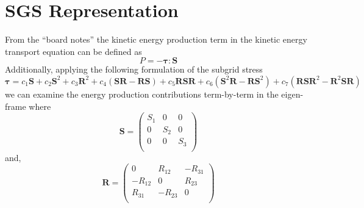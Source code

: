 \newcommand{\sgsvec}{\mathbf{\tau}} 
\newcommand{\svec}{\mathbf{S}}
\newcommand{\rvec}{\mathbf{R}}
\newpage
\section{SGS Representation}
From the ``board notes'' the kinetic energy production term in the kinetic
energy transport equation can be defined as
\begin{equation}
    P =  - \sgsvec:\svec
\end{equation}
Additionally, applying the following  formulation of the subgrid stress 
\begin{equation}
    \sgsvec = c_{1} \svec + c_{2} \svec^2 + c_{3} \rvec^2
                + c_{4} \left(\svec \rvec - \rvec \svec \right)
                + c_{5} \rvec \svec \rvec 
                + c_{6} \left(\svec^2 \rvec - \rvec \svec^2 \right)
                + c_{7} \left( \rvec \svec \rvec^2 - \rvec^2 \svec \rvec \right) 
\end{equation}
we can examine the energy production contributions term-by-term in the 
eigen-frame where
\begin{equation}
    \svec =
    \begin{pmatrix}
        S_{1}      & 0         & 0         \\
        0           & S_{2}    & 0         \\
        0           & 0         & S_{3}    \\
    \end{pmatrix}
\end{equation}
and,
\begin{equation}
    \rvec =
    \begin{pmatrix}
        0           & R_{12}    & -R_{31}   \\
        -R_{12}     & 0         & R_{23}    \\
        R_{31}      & -R_{23}   & 0         \\
    \end{pmatrix}
\end{equation}








